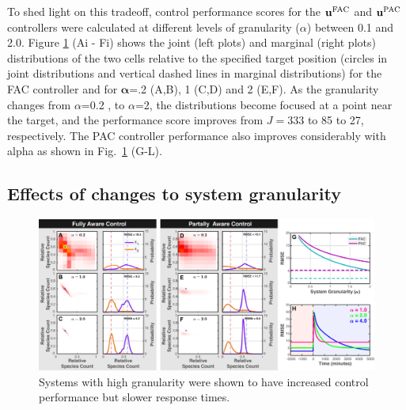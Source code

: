 \documentclass[12pt]{article}
\begin{document}
To shed light on this tradeoff, control performance scores for the $\mathbf{u}^{\rm FAC}$ and $\mathbf{u}^{\rm PAC}$ controllers were calculated at different levels of granularity ($\alpha$) between 0.1 and 2.0. 
Figure \ref{Volume} (Ai - Fi) shows the joint (left plots) and marginal (right plots) distributions of the two cells relative to the specified target position (circles in joint distributions and vertical dashed lines in marginal distributions) for the FAC controller and for $\mathbf{\alpha}$=.2 (A,B), 1 (C,D) and 2 (E,F). As the granularity changes from $\alpha$=0.2 , to $\alpha$=2, the distributions become focused at a point near the target, and the performance score improves from $J=$333 to 85 to 27, respectively. The PAC controller performance also improves considerably with alpha as shown in Fig.\ \ref{Volume} (G-L).
\subsection{Effects of changes to system granularity}
\begin{figure}[t!]
\begin{center}
\includegraphics[width=1\textwidth]{GranularityPerturbation.pdf}
\vspace{-0.1in}
\caption{Systems with high granularity were shown to have increased control performance but slower response times.}
\label{Volume}
\end{center}
\vspace{-0.2in}
\end{figure}
\end{document}
